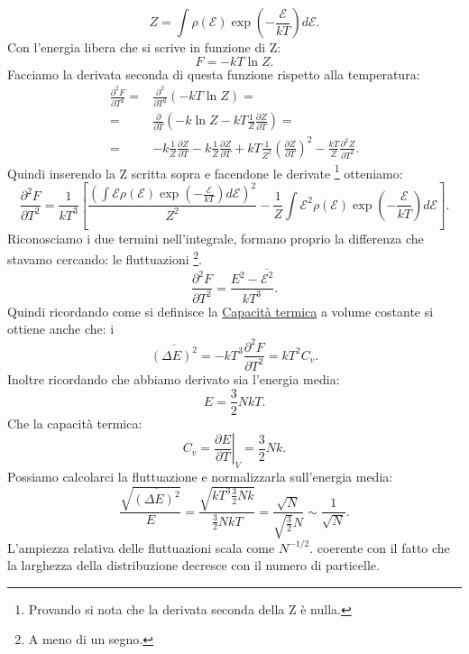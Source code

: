 \[
	Z = \int\rho\left( \mathcal{E} \right) \exp\left( -\frac{\mathcal{E}}{kT} \right) d\mathcal{E}
.\] 
Con l'energia libera che si scrive in funzione di Z:
\[
	F = -kT \ln Z
.\]
Facciamo la derivata seconda di questa funzione rispetto alla temperatura:
\begin{align}
	\frac{\partial ^2 F}{\partial T^2} =& \frac{\partial ^2}{\partial T^2} \left( -kT \ln Z \right) =\\
	=&\frac{\partial }{\partial T} \left( -k\ln Z -kT \frac{1}{Z} \frac{\partial Z}{\partial T}  \right) =\\
	=&-k \frac{1}{Z}\frac{\partial Z}{\partial T} 
		- k \frac{1}{Z}\frac{\partial Z}{\partial T} 
		+ kT \frac{1}{Z^2}\left( \frac{\partial Z}{\partial T}  \right) ^2 
		- \frac{kT}{Z}\frac{\partial ^2 Z}{\partial T^2} 
.\end{align}
Quindi inserendo la Z scritta sopra e facendone le derivate \footnote{Provando si nota che la derivata seconda della Z è nulla.} otteniamo:
\[
	\frac{\partial ^2 F}{\partial T^2} = \frac{1}{kT^3} 
	\left[
		\frac{\left( \int \mathcal{E}\rho(\mathcal{E})\exp\left( -\frac{\mathcal{E}}{kT}  \right)d\mathcal{E} \right)^2  }{Z^2}  
		- \frac{1}{Z}\int \mathcal{E}^2\rho\left( \mathcal{E} \right) \exp\left( - \frac{\mathcal{E}}{kT} \right)d\mathcal{E}  
	\right]
.\] 
Riconosciamo i due termini nell'integrale, formano proprio la differenza che stavamo cercando: le fluttuazioni \footnote{A meno di un segno.}.
\[
	\frac{\partial ^2 F}{\partial T^2} = \frac{E^2-\overline{\mathcal{E}^2}}{kT^3}
.\] 
Quindi ricordando come si definisce la \hyperref[eq:capacita-termica]{Capacità termica} a volume costante si ottiene anche che: 
i
\[
	\overline{\left( \Delta E \right) ^2} = -kT^3 \frac{\partial ^2 F}{\partial T^2} = kT^2 C_{v}
.\] 
Inoltre ricordando che abbiamo derivato sia l'energia media:
\[
	E = \frac{3}{2}N kT
.\] 
Che la capacità termica:
\[
	C_{v} = \left.\frac{\partial E}{\partial T} \right|_{V} =  \frac{3}{2}Nk
.\] 
Possiamo calcolarci la fluttuazione e normalizzarla sull'energia media:
\[
	\frac{\sqrt{\overline{\left( \Delta E \right) ^2}} }{E} = \frac{\sqrt{kT^3 \frac{3}{2}Nk} }{\frac{3}{2}NkT} = \frac{\sqrt{N} }{\sqrt{\frac{3}{2}}N}\sim \frac{1}{\sqrt{N} }
.\] 
L'ampiezza relativa delle fluttuazioni scala come $N^{-1 /2 }$. coerente con il fatto che la larghezza della distribuzione decresce con il numero di particelle.\\
